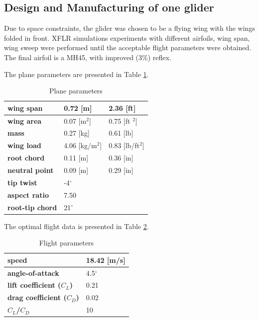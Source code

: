 \subsection{Design and Manufacturing of one glider}

Due to space constraints, the glider was chosen to be a flying wing with the wings folded in front. XFLR simulations experiments with different airfoils, wing span, wing sweep were performed until the acceptable flight parameters were obtained. The final airfoil is a MH45, with improved (3\%) reflex.

The plane parameters are presented in Table \ref{plane_param}.

\begin{table}[h!]
\centering
\begin{tabular}{|l|l|l|}
\hline
\textbf{wing span}      & 0.72 {[}m{]}        & 2.36 {[}ft{]}        \\ \hline
\textbf{wing area}      & 0.07 {[}m$^2${]}    & 0.75 {[}ft $^2${]}   \\ \hline
\textbf{mass}           & 0.27 {[}kg{]}       & 0.61 {[}lb{]}        \\ \hline
\textbf{wing load}      & 4.06 {[}kg/m$^2${]} & 0.83 {[}lb/ft$^2${]} \\ \hline
\textbf{root chord}     & 0.11 {[}m{]}        & 0.36 {[}in{]}        \\ \hline
\textbf{neutral point}  & 0.09 {[}m{]}        & 0.29 {[}in{]}        \\ \hline
\textbf{tip twist}      & -4$^\circ$        &                      \\ \hline
\textbf{aspect ratio}   & 7.50                &                      \\ \hline
\textbf{root-tip chord} & 21$^\circ$        &                      \\ \hline
\end{tabular}
\caption{Plane parameters}
\label{plane_param}
\end{table}


The optimal flight data is presented in Table \ref{flight_param}.

\begin{table}[h!]
\centering
\begin{tabular}{|l|l|}
\hline
\textbf{speed}                    & 18.42 {[}m/s{]} \\ \hline
\textbf{angle-of-attack}          & 4.5$^\circ$                        \\ \hline
\textbf{lift coefficient ($C_L$)} & 0.21                               \\ \hline
\textbf{drag coefficient ($C_D$)} & 0.02                               \\ \hline
\textbf{$C_L$/$C_D$}              & 10                                 \\ \hline
\end{tabular}
\caption{Flight parameters}
\label{flight_param}
\end{table}


